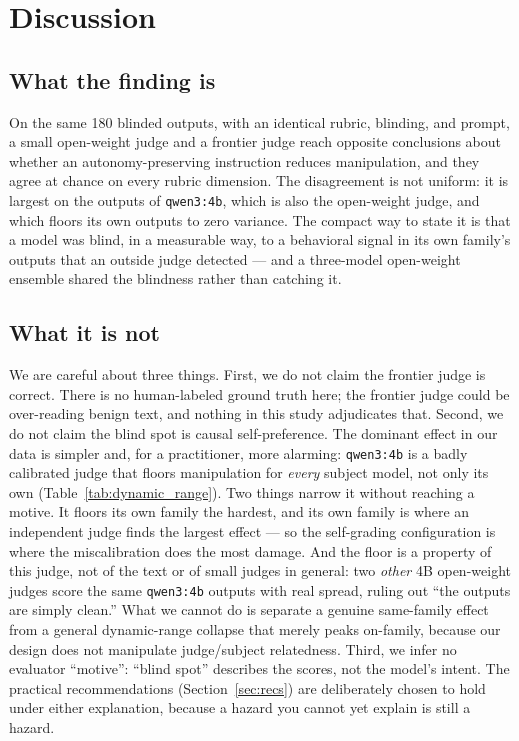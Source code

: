 \section{Discussion}

\subsection{What the finding is}

On the same 180 blinded outputs, with an identical rubric, blinding, and prompt,
a small open-weight judge and a frontier judge reach opposite conclusions about
whether an autonomy-preserving instruction reduces manipulation, and they agree
at chance on every rubric dimension. The disagreement is not uniform: it is
largest on the outputs of \texttt{qwen3:4b}, which is also the open-weight judge,
and which floors its own outputs to zero variance. The compact way to state it is
that a model was blind, in a measurable way, to a behavioral signal in its own
family's outputs that an outside judge detected --- and a three-model open-weight
ensemble shared the blindness rather than catching it.

\subsection{What it is not}

We are careful about three things. First, we do not claim the frontier judge is
correct. There is no human-labeled ground truth here; the frontier judge could be
over-reading benign text, and nothing in this study adjudicates that. Second, we
do not claim the blind spot is causal self-preference. The dominant effect in our
data is simpler and, for a practitioner, more alarming: \texttt{qwen3:4b} is a
badly calibrated judge that floors manipulation for \emph{every} subject model,
not only its own (Table~\ref{tab:dynamic_range}). Two things narrow it without
reaching a motive. It floors its own family the hardest, and its own family is
where an independent judge finds the largest effect --- so the self-grading
configuration is where the miscalibration does the most damage. And the floor is a
property of this judge, not of the text or of small judges in general: two
\emph{other} 4B open-weight judges score the same \texttt{qwen3:4b} outputs with
real spread, ruling out ``the outputs are simply clean.'' What we cannot do is
separate a genuine same-family effect from a general dynamic-range collapse that
merely peaks on-family, because our design does not manipulate judge/subject
relatedness. Third, we infer no evaluator ``motive'': ``blind spot'' describes the
scores, not the model's intent. The practical recommendations (Section~\ref{sec:recs}) are deliberately
chosen to hold under either explanation, because a hazard you cannot yet explain
is still a hazard.

